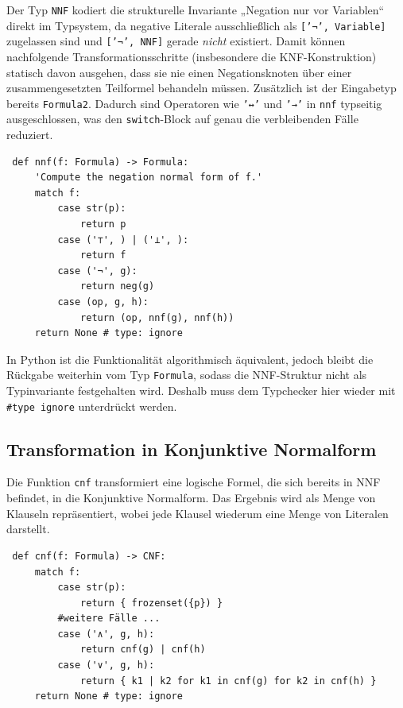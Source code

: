 Der Typ \texttt{NNF} kodiert die strukturelle Invariante „Negation nur vor Variablen“ direkt im Typsystem, da negative Literale ausschließlich als \texttt{['¬', Variable]} zugelassen sind und \texttt{['¬', NNF]} gerade \textit{nicht} existiert. %
Damit können nachfolgende Transformationsschritte (insbesondere die \ac{KNF}-Konstruktion) statisch davon ausgehen, dass sie nie einen Negationsknoten über einer zusammengesetzten Teilformel behandeln müssen. 
Zusätzlich ist der Eingabetyp bereits \texttt{Formula2}. Dadurch sind Operatoren wie \texttt{'↔'} und \texttt{'→'} in \texttt{nnf} typseitig ausgeschlossen, was den \texttt{switch}-Block auf genau die verbleibenden Fälle reduziert.

\begin{verbatim}
 def nnf(f: Formula) -> Formula:
     'Compute the negation normal form of f.'
     match f:
         case str(p):
             return p
         case ('⊤', ) | ('⊥', ):
             return f
         case ('¬', g):
             return neg(g)
         case (op, g, h):
             return (op, nnf(g), nnf(h))
     return None # type: ignore
\end{verbatim}

In Python ist die Funktionalität algorithmisch äquivalent, jedoch bleibt die Rückgabe weiterhin vom Typ \texttt{Formula}, sodass die \ac{NNF}-Struktur nicht als Typinvariante festgehalten wird. Deshalb muss dem Typchecker hier wieder mit \texttt{\#type ignore} unterdrückt werden.


\subsection{Transformation in Konjunktive Normalform}

Die Funktion \texttt{cnf} transformiert eine logische Formel, die sich bereits in \ac{NNF} befindet, in die Konjunktive Normalform. Das Ergebnis wird als Menge von Klauseln repräsentiert, wobei jede Klausel wiederum eine Menge von Literalen darstellt. 

\begin{verbatim}
 def cnf(f: Formula) -> CNF:
     match f:
         case str(p):         
             return { frozenset({p}) }
         #weitere Fälle ...
         case ('∧', g, h):
             return cnf(g) | cnf(h)
         case ('∨', g, h):
             return { k1 | k2 for k1 in cnf(g) for k2 in cnf(h) }
     return None # type: ignore
\end{verbatim}

